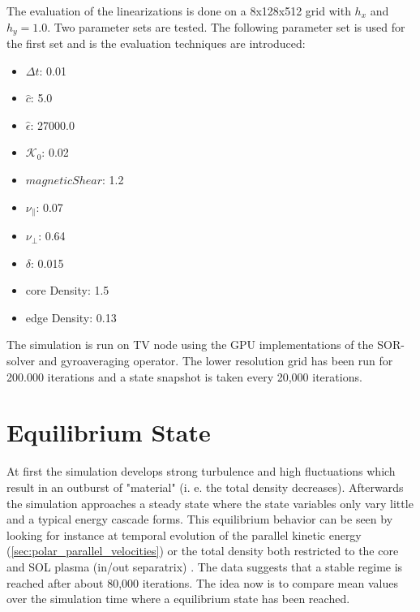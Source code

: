 \documentclass[master.tex]{subfiles}
\begin{document}
The evaluation of the linearizations is done on a 8x128x512 grid with $h_x$ and $h_y=1.0$. Two parameter sets are tested. The following parameter set is used for the first set and is the evaluation techniques are introduced:
\begin{itemize}
    \item $\Delta t$: 0.01
    \item $\hat{c}$: 5.0
    \item $\hat{\epsilon}$: 27000.0
    \item $\mathcal{K}_0$: 0.02
    \item $magnetic Shear$: 1.2
    \item $\nu_{\parallel}$: 0.07
    \item $\nu_{\perp}$: 0.64
    \item $\delta$: 0.015
    \item core Density: 1.5
    \item edge Density: 0.13
\end{itemize}
The simulation is run on \ac{TV} node using the GPU implementations of the \ac{SOR}-solver and gyroaveraging operator. The lower resolution grid has been run for 200.000 iterations and a state snapshot is taken every 20,000 iterations.

\section{Equilibrium State}
At first the simulation develops strong turbulence and high fluctuations which result in an outburst of "material" (i. e. the total density decreases). Afterwards the simulation approaches a steady state where the state variables only vary little and a typical energy cascade forms. This equilibrium behavior can be seen by looking for instance at temporal evolution of the parallel kinetic energy (\autoref{sec:polar_parallel_velocities}) or the total density both restricted to the core and \ac{SOL} plasma (in/out separatrix) . The data suggests that a stable regime is reached after about 80,000 iterations. The idea now is to compare mean values over the simulation time where a equilibrium state has been reached. 
\end{document}
